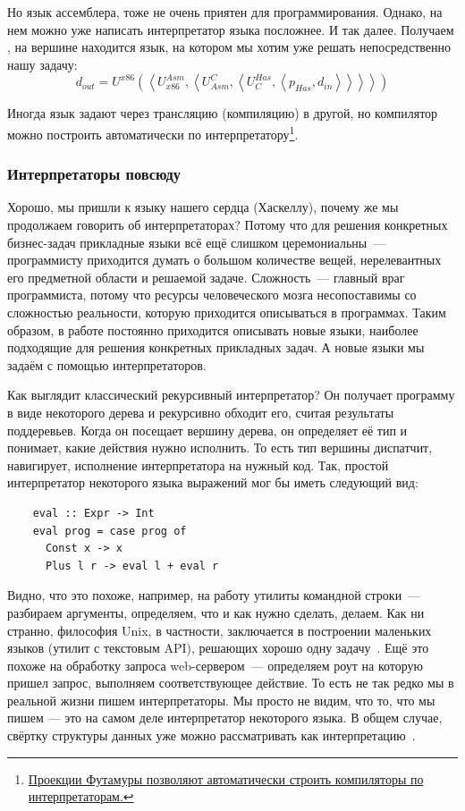 Но язык ассемблера, тоже не очень приятен для программирования.
Однако, на нем можно уже написать интерпретатор языка посложнее.
И так далее.
Получаем , на вершине находится язык, на котором мы хотим уже решать непосредственно нашу задачу:
\[
    d_{out} =
    U^{x86}\left(\left<
                     U_{x86}^{Asm}, \left<
                                        U^C_{Asm}, \left<
                                                       U^{Has}_C, \left< p_{Has}, d_{in}
                \right>\right>\right>\right>\right)
\]

Иногда язык задают через трансляцию (компиляцию) в другой, но компилятор можно построить автоматически по интерпретатору\footnote{\href{https://habr.com/ru/articles/47418/}{Проекции Футамуры позволяют автоматически строить компиляторы по интерпретаторам.}}.

\subsubsection{Интерпретаторы повсюду} \label{subsec:interpreters-everywhere}

Хорошо, мы пришли к языку нашего сердца (Хаскеллу), почему же мы продолжаем говорить об интерпретаторах?
Потому что для решения конкретных бизнес-задач прикладные языки всё ещё слишком церемониальны~--- программисту приходится думать о большом количестве вещей, нерелевантных его предметной области и решаемой задаче.
Сложность~--- главный враг программиста, потому что ресурсы человеческого мозга несопоставимы со сложностью реальности, которую приходится описываться в программах.
Таким образом, в работе постоянно приходится описывать новые языки, наиболее подходящие для решения конкретных прикладных задач.
А новые языки мы задаём с помощью интерпретаторов.

Как выглядит классический рекурсивный интерпретатор?
Он получает программу в виде некоторого дерева и рекурсивно обходит его, считая результаты поддеревьев.
Когда он посещает вершину дерева, он определяет её тип и понимает, какие действия нужно исполнить.
То есть тип вершины диспатчит, навигирует, исполнение интерпретатора на нужный код.
Так, простой интерпретатор некоторого языка выражений мог бы иметь следующий вид:
\begin{verbatim}
    eval :: Expr -> Int
    eval prog = case prog of
      Const x -> x
      Plus l r -> eval l + eval r
\end{verbatim}

Видно, что это похоже, например, на работу утилиты командной строки~--- разбираем аргументы, определяем, что и как нужно сделать, делаем.
Как ни странно, философия Unix, в частности, заключается в построении маленьких языков (утилит с текстовым API), решающих хорошо одну задачу~\cite{bentley1986little}.
Ещё это похоже на обработку запроса web-сервером~--- определяем роут на которую пришел запрос, выполняем соответствующее действие.
То есть не так редко мы в реальной жизни пишем интерпретаторы.
Мы просто не видим, что то, что мы пишем --- это на самом деле интерпретатор некоторого языка.
В общем случае, свёртку структуры данных уже можно рассматривать как интерпретацию~\cite{gibbons2014folding}.

